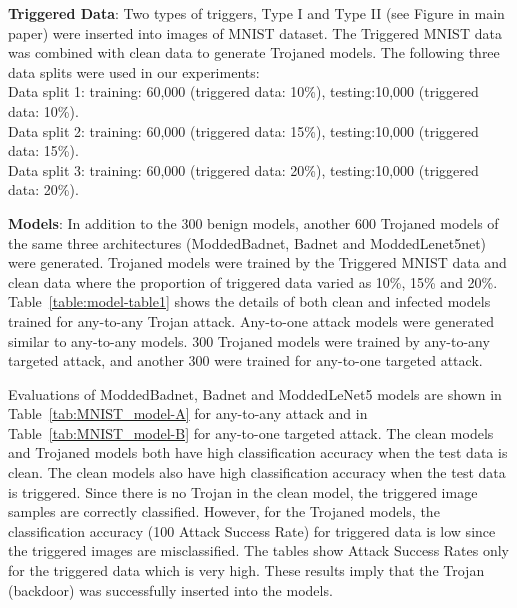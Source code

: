 \documentclass{article}
\begin{document}
\textbf{Triggered Data}: Two types of triggers, Type I and Type II (see Figure in main paper) were inserted into  images of MNIST dataset.
The Triggered MNIST data was combined with clean data to generate Trojaned models. The following three data splits were used in our experiments:\\
Data split 1: training: 60,000 (triggered data: 10\%),  testing:10,000 (triggered data: 10\%).\\
Data split 2: training: 60,000 (triggered data: 15\%),  testing:10,000 (triggered data: 15\%).\\
Data split 3: training: 60,000 (triggered data: 20\%),  testing:10,000 (triggered data: 20\%).
    
\textbf{Models}: 
In addition to the 300 benign models, another 600 Trojaned models of the same three architectures (ModdedBadnet, Badnet and ModdedLenet5net) were generated. 
 Trojaned models were trained by the Triggered MNIST data and clean data where the proportion of triggered data varied as 10\%, 15\% and 20\%. Table~\ref{table:model-table1} shows the details of both clean  and infected models trained for any-to-any Trojan attack. Any-to-one attack models were generated similar to any-to-any models.
300 Trojaned models were trained by any-to-any targeted attack, and another 300 were trained for any-to-one targeted attack.

Evaluations of ModdedBadnet, Badnet and ModdedLeNet5 models are shown in Table~\ref{tab:MNIST_model-A} for any-to-any attack and in Table~\ref{tab:MNIST_model-B} for any-to-one targeted attack. The clean models and Trojaned models both have high classification accuracy when the test data is clean. The clean  models also have high classification accuracy when the test data is triggered. Since there is no Trojan in the clean model, the triggered image samples are correctly classified. However, for the Trojaned models, the classification accuracy (100  Attack Success Rate) for triggered data is low since the triggered images are misclassified. The tables show Attack Success Rates only for the triggered data which is very high. These results imply that the Trojan (backdoor) was successfully inserted into the models.
\end{document}
